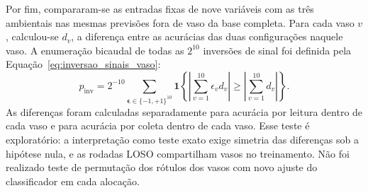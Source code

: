 Por fim, compararam-se as entradas fixas de nove variáveis com as três
ambientais nas mesmas previsões fora de vaso da base completa. Para cada
vaso $v$, calculou-se $d_v$, a diferença entre as acurácias das duas
configurações naquele vaso. A enumeração bicaudal de todas as $2^{10}$
inversões de sinal foi definida pela Equação~\eqref{eq:inversao_sinais_vaso}:
\begin{equation}
    p_{\mathrm{inv}}=2^{-10}
    \sum_{\boldsymbol{\epsilon}\in\{-1,+1\}^{10}}
    \mathbf{1}\!\left\{
    \left|\sum_{v=1}^{10}\epsilon_v d_v\right|
    \geq
    \left|\sum_{v=1}^{10}d_v\right|
    \right\}.
    \label{eq:inversao_sinais_vaso}
\end{equation}
As diferenças foram calculadas separadamente para acurácia por leitura
dentro de cada vaso e para acurácia por coleta dentro de cada vaso.
Esse teste é exploratório: a interpretação como teste exato exige
simetria das diferenças sob a hipótese nula, e as rodadas LOSO compartilham
vasos no treinamento. Não foi realizado teste de permutação dos rótulos
dos vasos com novo ajuste do classificador em cada alocação.

